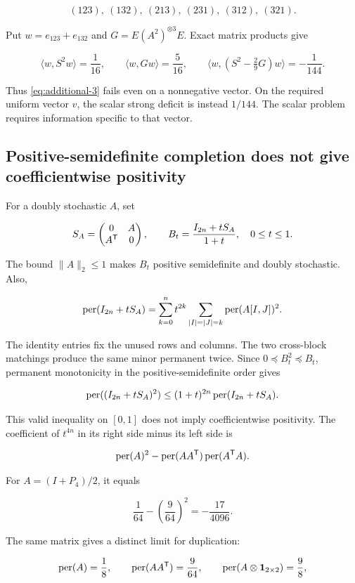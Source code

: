 \[
(123),\ (132),\ (213),\ (231),\ (312),\ (321).
\]

Put \(w=e_{123}+e_{132}\) and \(G=E(A^2)^{\otimes3}E\). Exact matrix products give

\[
\langle w,S^2w\rangle=\frac1{16},\qquad
\langle w,Gw\rangle=\frac5{16},\qquad
\langle w,(S^2-\tfrac29G)w\rangle=-\frac1{144}.
\]

Thus \eqref{eq:additional-3} fails even on a nonnegative vector. On the required uniform vector \(v\), the scalar strong deficit is instead \(1/144\). The scalar problem requires information specific to that vector.

\subsection{Positive-semidefinite completion does not give coefficientwise positivity}\label{app:additional-11}

For a doubly stochastic \(A\), set

\[
S_A=\begin{pmatrix}0&A\\A^{\mathsf{T}}&0\end{pmatrix},\qquad
B_t=\frac{I_{2n}+tS_A}{1+t},\quad0\le t\le1.
\]

The bound \(\|A\|_2\le1\) makes \(B_t\) positive semidefinite and doubly stochastic. Also,

\[
\operatorname{per}(I_{2n}+tS_A)
=\sum_{k=0}^n t^{2k}
\sum_{|I|=|J|=k}\operatorname{per}(A[I,J])^2.
\]

The identity entries fix the unused rows and columns. The two cross-block matchings produce the same minor permanent twice. Since \(0\preceq B_t^2\preceq B_t\), permanent monotonicity in the positive-semidefinite order gives

\[
\operatorname{per}((I_{2n}+tS_A)^2)
\le(1+t)^{2n}\operatorname{per}(I_{2n}+tS_A).
\]

This valid inequality on \([0,1]\) does not imply coefficientwise positivity. The coefficient of \(t^{4n}\) in its right side minus its left side is

\[
\operatorname{per}(A)^2
-\operatorname{per}(AA^{\mathsf{T}})\operatorname{per}(A^{\mathsf{T}}A).
\]

For \(A=(I+P_4)/2\), it equals

\[
\frac1{64}-\left(\frac9{64}\right)^2=-\frac{17}{4096}.
\]

The same matrix gives a distinct limit for duplication:

\[
\operatorname{per}(A)=\frac18,\qquad
\operatorname{per}(AA^{\mathsf{T}})=\frac9{64},\qquad
\operatorname{per}(A\otimes\mathbf1_{2\times2})=\frac98,
\]


